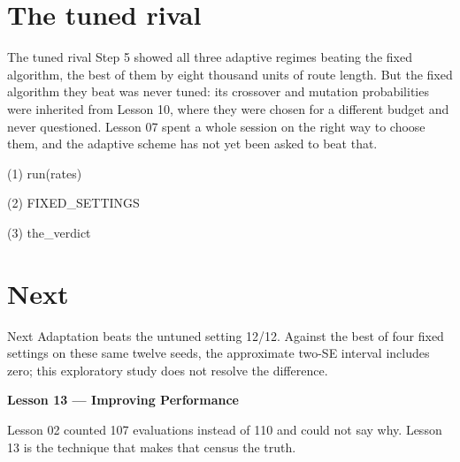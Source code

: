 \section{The tuned rival}

\begin{frame}{The tuned rival}
Step 5 showed all three adaptive regimes beating the fixed algorithm, the best of
them by eight thousand units of route length. But the fixed algorithm they beat was never tuned: its
crossover and mutation probabilities were inherited from Lesson 10, where they
were chosen for a different budget and never questioned. Lesson 07 spent a whole
session on the right way to choose them, and the adaptive scheme has not yet
been asked to beat that.
\end{frame}

\begin{frame}[fragile]{(1) run(rates)}

\end{frame}

\begin{frame}[fragile]{(2) FIXED\_SETTINGS}

\end{frame}

\begin{frame}[fragile]{(3) the\_verdict}

\end{frame}


\section{Next}

\begin{frame}{Next}
Adaptation beats the untuned setting 12/12. Against the best of four fixed settings on these same twelve seeds, the approximate two-SE interval includes zero; this exploratory study does not resolve the difference.

\vspace{0.8em}
\textbf{Lesson 13 --- Improving Performance}

Lesson 02 counted 107 evaluations instead of 110 and could not say why. Lesson 13 is the technique that makes that census the truth.
\end{frame}

